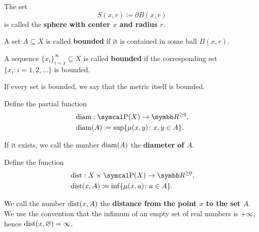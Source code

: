 \begin{definition}
\begin{defenum}
     The set
    \begin{equation*}
      S(x, r) \coloneqq \partial{B(x, r)}
    \end{equation*}
    is called the \textbf{sphere with center \( x \) and radius \( r \)}.

     A set \( A \subseteq X \) is called \textbf{bounded} if it is contained in some ball \( B(x, r) \).

     A sequence \( \{ x_i \}_{i=1}^\infty \subseteq X \) is called \textbf{bounded} if the corresponding set \( \{ x_i \colon i = 1, 2, \ldots \} \) is bounded.

     If every set is bounded, we say that the metric itself is bounded.

     Define the partial function
    \begin{align*}
      &\Diam: \Power(X) \to \BB{R}^{\geq 0}, \\
      &\Diam(A) \coloneqq \sup \{ \mu(x, y) \colon x, y \in A \}.
    \end{align*}

    If it exists, we call the number \( \operatorname{diam}(A) \) the \textbf{diameter of \( A \)}.

     Define the function
    \begin{align*}
      &\Dist: X \times \Power(X) \to \BB{R}^{\geq 0}, \\
      &\Dist(x, A) \coloneqq \inf \{ \mu(x, a) \colon a \in A \}.
    \end{align*}

    We call the number \( \operatorname{dist}(x, A) \) the \textbf{distance from the point \( x \) to the set \( A \)}. We use the convention that the infimum of an empty set of real numbers is \( +\infty \), hence \( \operatorname{dist}(x, \varnothing) = \infty \).
  \end{defenum}
\end{definition}

